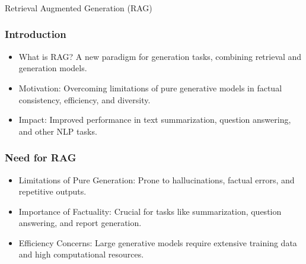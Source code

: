 \begin{frame}[fragile]\frametitle{}
\begin{center}
{\Large Retrieval Augmented Generation (RAG)}
\end{center}
\end{frame}

\begin{frame}[fragile]\frametitle{Introduction}

\begin{itemize}
\item What is RAG? A new paradigm for generation tasks, combining retrieval and generation models.
\item Motivation: Overcoming limitations of pure generative models in factual consistency, efficiency, and diversity.
\item Impact: Improved performance in text summarization, question answering, and other NLP tasks.
\end{itemize}	

\end{frame}


\begin{frame}[fragile]\frametitle{Need for RAG}

\begin{itemize}
\item Limitations of Pure Generation: Prone to hallucinations, factual errors, and repetitive outputs.
\item Importance of Factuality: Crucial for tasks like summarization, question answering, and report generation.
\item Efficiency Concerns: Large generative models require extensive training data and high computational resources.
\end{itemize}	

\end{frame}



